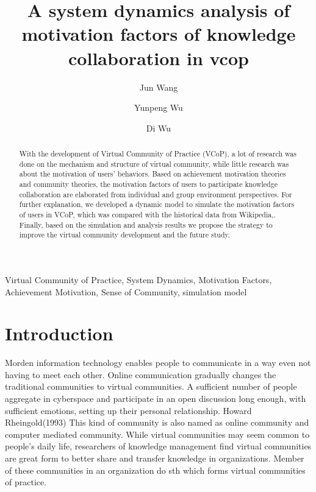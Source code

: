 \documentclass{elsarticle}
\begin{document}
\begin{frontmatter}
\title{A system dynamics analysis of motivation factors of knowledge collaboration in vcop}
\author[buaa]{Jun Wang}

\author[buaa]{Yunpeng Wu}

\author[buaa]{Di Wu}

\address[buaa]{School of Economics and Management, Beihang University, 
Beijing 100083, P.R. China}

\begin{abstract}
 With the development of Virtual Community of Practice (VCoP), a lot of research was done on the mechanism and structure of virtual community, while little research was about the motivation of users’ behaviors. Based on achievement motivation theories and community theories, the motivation factors of users to participate knowledge collaboration are elaborated from individual and group environment perspectives. For further explanation, we developed a dynamic model to simulate the motivation factors of users in VCoP, which was compared with the historical data from Wikipedia,. Finally, based on the simulation and analysis results we propose the strategy to improve the virtual community development and the future study. 

\end{abstract}

\begin{keyword}
  Virtual Community of Practice, System Dynamics, Motivation Factors, Achievement Motivation, Sense of Community, simulation model

\end{keyword}
\end{frontmatter}

\section{Introduction}
\label{sec:introduction}
Morden information technology enables people to communicate in a way
even not having to meet each other. Online communication gradually changes the
traditional communities to virtual communities.  A sufficient number of
people  aggregate in cyberspace and participate in  an open discussion
long enough, with sufficient emotions, setting up  their personal
relationship. Howard Rheingold(1993) This kind of community is also
named as online community and computer mediated community. While
virtual communities may seem common to people's daily life,
researchers of knowledge management find virtual communities are great
form to better share and transfer knowledge in organizations. Member
of these communities in an organization do sth which forms virtual
communities of practice. 
\end{document}

